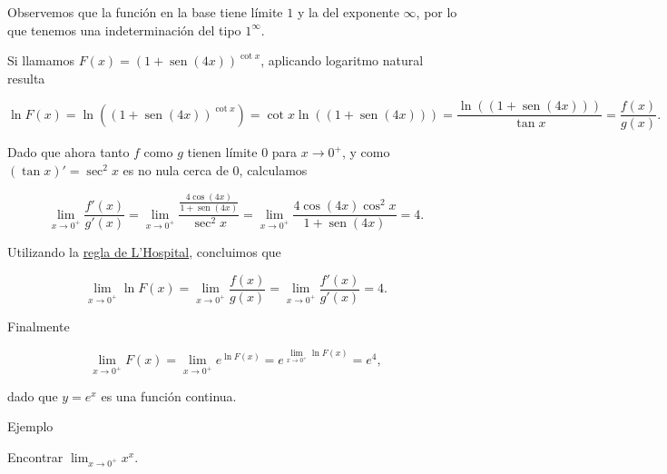 \documentclass[
  letterpaper,
]{book}
\theoremstyle{plain}
\theoremstyle{remark}
\begin{document}
\begin{tcolorbox}[enhanced jigsaw, opacityback=0, left=2mm, opacitybacktitle=0.6, toprule=.15mm, bottomrule=.15mm, colbacktitle=quarto-callout-tip-color!10!white, titlerule=0mm, bottomtitle=1mm, title=\textcolor{quarto-callout-tip-color}{\faLightbulb}\hspace{0.5em}{Solución}, toptitle=1mm, colframe=quarto-callout-tip-color-frame, colback=white, breakable, rightrule=.15mm, arc=.35mm, leftrule=.75mm, coltitle=black]

Observemos que la función en la base tiene límite \(1\) y la del
exponente \(\infty\), por lo que tenemos una indeterminación del tipo
\(1^\infty\).

Si llamamos \(F(x)=(1+\operatorname{sen}(4x))^{\cot x}\), aplicando
logaritmo natural resulta

\[
\ln F(x) =\ln\left((1+\operatorname{sen}(4x))^{\cot x}\right)=\cot x \ln((1+\operatorname{sen}(4x)))=\frac{\ln((1+\operatorname{sen}(4x)))}{\tan x}=\frac{f(x)}{g(x)}.
\]

Dado que ahora tanto \(f\) como \(g\) tienen límite \(0\) para
\(x\to 0^+\), y como \((\tan x)'=\sec^2 x\) es no nula cerca de \(0\),
calculamos

\[
\lim_{x\to 0^+}\frac{f'(x)}{g'(x)}=\lim_{x\to 0^+}\frac{\frac{4\cos(4x)}{1+\operatorname{sen}(4x)}}{\sec^2x}=\lim_{x\to 0^+} \frac{4\cos(4x)\cos^2 x}{1+\operatorname{sen}(4x)}=4.
\]

Utilizando la \hyperref[teo-regla-LH]{regla de L'Hospital}, concluimos
que

\[
\lim_{x\to 0^+}\ln F(x)=\lim_{x\to 0^+}\frac{f(x)}{g(x)}=\lim_{x\to 0^+}\frac{f'(x)}{g'(x)}=4.
\]

Finalmente

\[
\lim_{x\to 0^+} F(x)=\lim_{x\to 0^+} e^{\ln F(x)}=e^{\lim_{x\to 0^+} \ln F(x)}=e^4,
\]

dado que \(y=e^x\) es una función continua.

\end{tcolorbox}

Ejemplo

Encontrar \(\lim_{x\to 0^+}x^x\).
\end{document}
